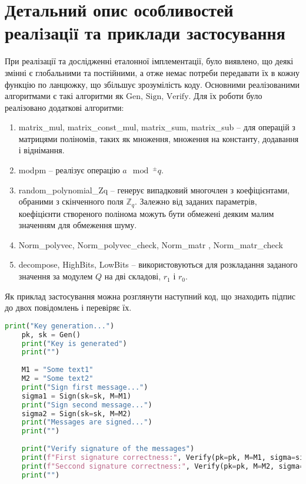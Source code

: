 \documentclass[12pt]{HomusWorkus}
\begin{document}
\section{Детальний опис особливостей реалiзацiї та приклади застосування}

При реалізації та дослідженні еталонної імплементації, було виявлено, що деякі змінні є глобальними та постійними, а отже немає потреби передавати їх в кожну функцію по ланцюжку, що збільшує зрозумілість коду. Основними реалізованими алгоритмами є такі алгоритми як $\mathrm{Gen}$, $\mathrm{Sign}$, $\mathrm{Verify}$. Для їх роботи було реалізовано додаткові алгоритми:
\begin{enumerate}
    \item matrix\_mul, matrix\_const\_mul, matrix\_sum, matrix\_sub -- для операцій з матрицями поліномів, таких як множення, множення на константу, додавання і віднімання.
    \item modpm -- реалізує операцію $a \mod^{\pm} q$.
    \item random\_polynomial\_Zq -- генерує випадковий многочлен з коефіцієнтами, обраними з скінченного поля $\mathbb{Z}_q$. Залежно від заданих параметрів, коефіцієнти створеного полінома можуть бути обмежені деяким малим значенням для обмеження шуму.
    \item Norm\_polyvec, Norm\_polyvec\_check, Norm\_matr ,  Norm\_matr\_check
    \item decompose, HighBits, LowBits -- використовуються для розкладання заданого значення за модулем $Q$ на дві складові, $r_1$ і $r_0$.
\end{enumerate}

Як приклад застосування можна розглянути наступний код, що знаходить підпис до двох повідомлень і перевіряє їх.

\begin{lstlisting}[language=Python]
    print("Key generation...")
    pk, sk = Gen()
    print("Key is generated")
    print("")
    
    M1 = "Some text1"
    M2 = "Some text2"
    print("Sign first message...")
    sigma1 = Sign(sk=sk, M=M1)
    print("Sign second message...")
    sigma2 = Sign(sk=sk, M=M2)
    print("Messages are signed...")
    print("")
    
    print("Verify signature of the messages")
    print(f"First signature correctness:", Verify(pk=pk, M=M1, sigma=sigma1))
    print(f"Seccond signature correctness:", Verify(pk=pk, M=M2, sigma=sigma2))
    print("")
\end{lstlisting}
\end{document}
